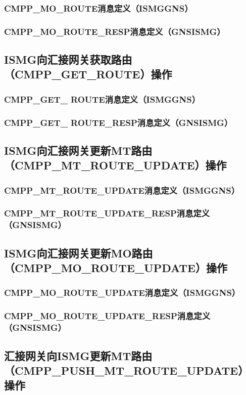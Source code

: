 \documentclass[11pt]{book} %
\begin{document}
\subsubsection{CMPP\_MO\_ROUTE消息定义（ISMG\textrightarrow GNS）}
\subsubsection{CMPP\_MO\_ROUTE\_RESP消息定义（GNS\textrightarrow ISMG）}
\subsection{ISMG向汇接网关获取路由（CMPP\_GET\_ROUTE）操作}
\subsubsection{CMPP\_GET\_ ROUTE消息定义（ISMG\textrightarrow GNS）}
\subsubsection{CMPP\_GET\_ ROUTE\_RESP消息定义（GNS\textrightarrow ISMG）}
\subsection{ISMG向汇接网关更新MT路由（CMPP\_MT\_ROUTE\_UPDATE）操作}
\subsubsection{CMPP\_MT\_ROUTE\_UPDATE消息定义（ISMG\textrightarrow GNS）}
\subsubsection{CMPP\_MT\_ROUTE\_UPDATE\_RESP消息定义（GNS\textrightarrow ISMG）}
\subsection{ISMG向汇接网关更新MO路由（CMPP\_MO\_ROUTE\_UPDATE）操作}
\subsubsection{CMPP\_MO\_ROUTE\_UPDATE消息定义（ISMG\textrightarrow GNS）}
\subsubsection{CMPP\_MO\_ROUTE\_UPDATE\_RESP消息定义（GNS\textrightarrow ISMG）}
\subsection{汇接网关向ISMG更新MT路由（CMPP\_PUSH\_MT\_ROUTE\_UPDATE）操作}
\end{document}
